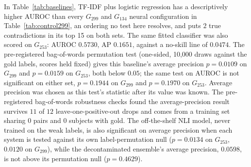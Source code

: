 In Table~\ref{tab:baselines}, TF-IDF plus logistic regression has a descriptively higher AUROC than every
$G_{299}$ and $G_{134}$ neural configuration in Table~\ref{tab:control299}, an
ordering no test here resolves, and puts $2$ true contradictions in its top
15 on both sets. The same fitted classifier was also scored on $G_{253}$:
AUROC $0.5730$, AP $0.1651$, against a no-skill line of $0.0474$. The
pre-registered bag-of-words permutation test (one-sided, 10,000 draws against the
gold labels, scores held fixed) gives this baseline's average precision
$p = 0.0109$ on $G_{299}$ and
$p = 0.0159$ on $G_{253}$, both below $0.05$; the same test on AUROC is not significant on
either set, $p = 0.1944$ on $G_{299}$ and $p = 0.1970$ on $G_{253}$. Average
precision was chosen as this test's statistic after its value was
known. The pre-registered bag-of-words robustness checks found the average-precision
result survives $11$ of $12$ leave-one-positive-out drops and comes
from a training set sharing $0$ pairs and $0$ subjects with gold. The
off-the-shelf NLI model, never trained on the weak labels, is also
significant on average precision when each system is tested against its own
label-permutation null ($p = 0.0134$ on $G_{253}$, $0.0120$ on
$G_{299}$), while the decontaminated ensemble's average precision, $0.0598$, is not
above its permutation null ($p = 0.4629$).

